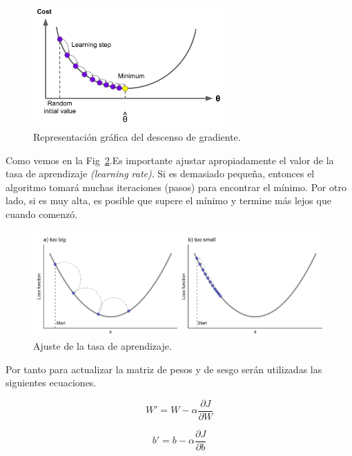 \documentclass[a4paper,12pt]{article}
\begin{document}
\begin{figure}[H]
	\begin{center}				
	\includegraphics[width=0.65\textwidth]{023.png}
  	\caption{Representación gráfica del descenso de gradiente.}
  	\label{fig:gd}
  	\end{center}
\end{figure}

Como vemos en la Fig~\ref{fig:lr}.Es importante ajustar apropiadamente el valor de la tasa de aprendizaje \textit{(learning rate)}. Si es demasiado pequeña, entonces el algoritmo tomará muchas iteraciones (pasos) para encontrar el mínimo. Por otro lado, si es muy alta, es posible que supere el mínimo y termine más lejos que cuando comenzó.

\begin{figure}[H]
	\begin{center}				
	\includegraphics[width=1\textwidth]{tesis_37.png}
  	\caption{Ajuste de la tasa de aprendizaje.}
  	\label{fig:lr}
  	\end{center}
\end{figure}

Por tanto para actualizar la matriz de pesos y de sesgo serán utilizadas las siguientes ecuaciones.

\begin{equation}
W' = W - \alpha \frac{\partial J}{\partial W}
\end{equation}

\begin{equation}
b' = b - \alpha \frac{\partial J}{\partial b}
\end{equation}
\end{document}
